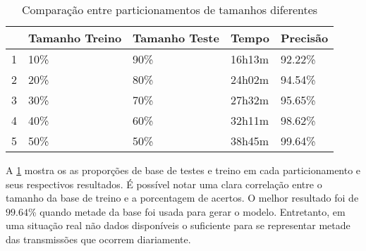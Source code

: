 \begin{table}[h]
    \caption{Comparação entre particionamentos de tamanhos diferentes}
    \label{table:partic}
    \begin{tabular}{l|l|l|l|l|}
        \cline{2-5}
                                                        & \multicolumn{1}{c|}{\cellcolor[HTML]{EFEFEF}Tamanho Treino} & \multicolumn{1}{c|}{\cellcolor[HTML]{EFEFEF}Tamanho Teste} & \multicolumn{1}{c|}{\cellcolor[HTML]{EFEFEF}Tempo} & \multicolumn{1}{c|}{\cellcolor[HTML]{EFEFEF}Precisão} \\ \hline
        \multicolumn{1}{|l|}{\cellcolor[HTML]{EFEFEF}1} & 10\%                                                        & 90\%                                                       & 16h13m                                             & 92.22\%                                               \\ \hline
        \multicolumn{1}{|l|}{\cellcolor[HTML]{EFEFEF}2} & 20\%                                                        & 80\%                                                       & 24h02m                                             & 94.54\%                                               \\ \hline
        \multicolumn{1}{|l|}{\cellcolor[HTML]{EFEFEF}3} & 30\%                                                        & 70\%                                                       & 27h32m                                             & 95.65\%                                               \\ \hline
        \multicolumn{1}{|l|}{\cellcolor[HTML]{EFEFEF}4} & 40\%                                                        & 60\%                                                       & 32h11m                                             & 98.62\%                                               \\ \hline
        \multicolumn{1}{|l|}{\cellcolor[HTML]{EFEFEF}5} & 50\%                                                        & 50\%                                                       & 38h45m                                             & 99.64\%                                               \\ \hline
    \end{tabular}
\end{table}

\par A \ref{table:partic} mostra os as proporções de base de testes e treino em cada particionamento e seus respectivos
resultados. É possível notar uma clara correlação entre o tamanho da base de treino e a porcentagem de acertos. O
melhor resultado foi de $99.64$\% quando metade da base foi usada para gerar o modelo. Entretanto, em uma situação real
não dados disponíveis o suficiente para se representar metade das transmissões que ocorrem diariamente.


